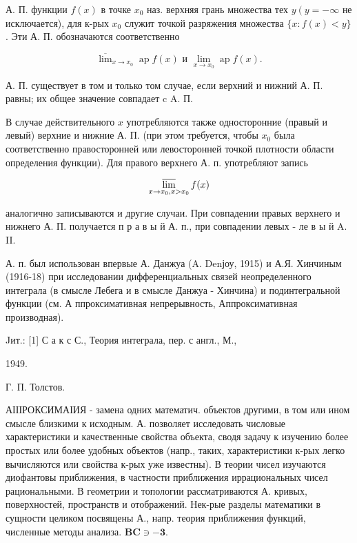 \documentclass[10pt]{article}
\begin{document}
А. П. функции $f(x)$ в точке $x_{0}$ наз. верхняя грань множества тех $y\left(y=-\infty\right.$ не исключается), для к-рых $x_{0}$ служит точкой разряжения множества $\{x: f(x)<y\}$. Эти А. П. обозначаются соответственно



\[

\overline{\lim }_{x \rightarrow x_{0}} \operatorname{ap} f(x) \text { и } \underset{x \rightarrow x_{0}}{\lim } \operatorname{ap} f(x) .

\]



А. П. существует в том и только том случае, если верхний и нижний А. П. равны; их общее значение совпадает c A. П.



В случае действительного $x$ употребляются также односторонние (правый и левый) верхние и нижние А. П. (при этом требуется, чтобы $x_{0}$ была соответственно правосторонней или левосторонней точкой плотности области определения функции). Для правого верхнего А. п. употребляют запись



\[

\varlimsup_{x \rightarrow x_{0}, x>x_{0}} f(x)

\]



аналогично записываются и другие случаи. При совпадении правых верхнего и нижнего А. П. получается п р а в ы й А. п., при совпадении левых - ле в ы й A. II.



А. п. был использован впервые А. Данжуа (A. Denјоу, 1915) и А.Я. Хинчиным (1916-18) при исследовании дифференциальных связей неопределенного интеграла (в смысле Лебега и в смысле Данжуа - Хинчина) и подинтегральной функции (см. А ппроксимативная непрерывность, Аппроксимативная производная).



Jит.: [1] С а к с С., Теория интеграла, пер. с англ., М.,

1949.

Г. П. Толстов.



АІІІРОКСИМАІИЯ - замена одних математич. объектов другими, в том или ином смысле близкими к исходным. А. позволяет исследовать числовые характеристики и качественные свойства объекта, сводя задачу к изучению более простых или более удобных объектов (напр., таких, характеристики к-рых легко вычисляются или свойства к-рых уже известны). В теории чисел изучаются диофантовы приближения, в частности приближения иррациональных чисел рациональными. В геометрии и топологии рассматриваются А. кривых, поверхностей, пространств и отображений. Нек-рые разделы математики в сущности целиком посвящены А., напр. теория приближения функций, численные методы анализа. $\boldsymbol{B C \ni - 3 . ~}$
\end{document}
